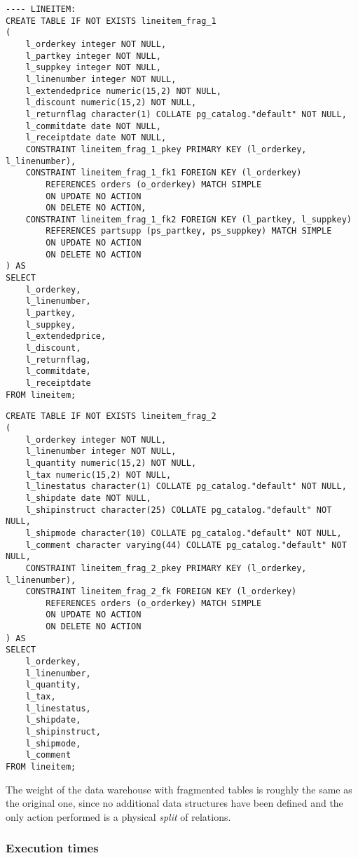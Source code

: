 \begin{lstlisting}
---- LINEITEM:
CREATE TABLE IF NOT EXISTS lineitem_frag_1
(
    l_orderkey integer NOT NULL,
    l_partkey integer NOT NULL,
    l_suppkey integer NOT NULL,
    l_linenumber integer NOT NULL,
    l_extendedprice numeric(15,2) NOT NULL,
    l_discount numeric(15,2) NOT NULL,
    l_returnflag character(1) COLLATE pg_catalog."default" NOT NULL,
    l_commitdate date NOT NULL,
    l_receiptdate date NOT NULL,
    CONSTRAINT lineitem_frag_1_pkey PRIMARY KEY (l_orderkey, l_linenumber),
    CONSTRAINT lineitem_frag_1_fk1 FOREIGN KEY (l_orderkey)
        REFERENCES orders (o_orderkey) MATCH SIMPLE
        ON UPDATE NO ACTION
        ON DELETE NO ACTION,
    CONSTRAINT lineitem_frag_1_fk2 FOREIGN KEY (l_partkey, l_suppkey)
        REFERENCES partsupp (ps_partkey, ps_suppkey) MATCH SIMPLE
        ON UPDATE NO ACTION
        ON DELETE NO ACTION
) AS
SELECT
	l_orderkey,
	l_linenumber,
	l_partkey,
	l_suppkey,
	l_extendedprice,
	l_discount,
	l_returnflag,
	l_commitdate,
	l_receiptdate
FROM lineitem;
\end{lstlisting}
\begin{lstlisting}
CREATE TABLE IF NOT EXISTS lineitem_frag_2
(
    l_orderkey integer NOT NULL,
    l_linenumber integer NOT NULL,
    l_quantity numeric(15,2) NOT NULL,
    l_tax numeric(15,2) NOT NULL,
    l_linestatus character(1) COLLATE pg_catalog."default" NOT NULL,
    l_shipdate date NOT NULL,
    l_shipinstruct character(25) COLLATE pg_catalog."default" NOT NULL,
    l_shipmode character(10) COLLATE pg_catalog."default" NOT NULL,
    l_comment character varying(44) COLLATE pg_catalog."default" NOT NULL,
    CONSTRAINT lineitem_frag_2_pkey PRIMARY KEY (l_orderkey, l_linenumber),
    CONSTRAINT lineitem_frag_2_fk FOREIGN KEY (l_orderkey)
        REFERENCES orders (o_orderkey) MATCH SIMPLE
        ON UPDATE NO ACTION
        ON DELETE NO ACTION
) AS
SELECT
	l_orderkey,
	l_linenumber,
	l_quantity,
	l_tax,
	l_linestatus,
	l_shipdate,
	l_shipinstruct,
	l_shipmode,
	l_comment
FROM lineitem;
\end{lstlisting}

The weight of the data warehouse with fragmented tables is roughly the same as the original one, since no additional data structures have been defined and the only action performed is a physical \textit{split} of relations.

\subsubsection{Execution times}

